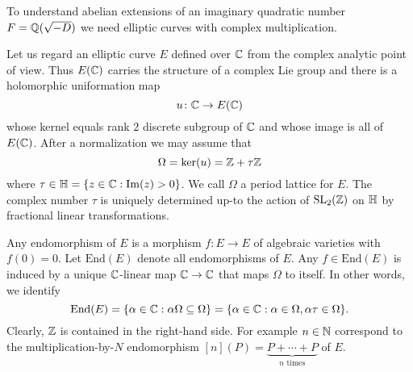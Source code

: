 To understand abelian extensions of an imaginary quadratic number
$F={\mathbb{Q}}(\sqrt{-D})$ we need elliptic curves with complex
multiplication.

Let us regard an elliptic curve $E$ defined over ${\mathbb{C}}$ from the
complex analytic point of view. Thus $E({\mathbb{C}})$ carries the structure of
a complex Lie group and there is a holomorphic uniformation map
\begin{equation*}
  u \colon {\mathbb{C}} \rightarrow E({\mathbb{C}})
\end{equation*}
whose kernel equals rank $2$ discrete subgroup of ${\mathbb{C}}$ and whose
image is all of $E({\mathbb{C}})$. After a normalization we may assume that
\begin{equation*}
  \Omega = \mathrm{ker}(u) = {\mathbb{Z}}+\tau{\mathbb{Z}}
\end{equation*}
where $\tau\in {\mathbb{H}} = \{z\in {\mathbb{C}} : \mathrm{Im}(z)>0\}$. We call
$\Omega$ a period lattice for $E$. The complex number $\tau$ is
uniquely determined up-to the action of $\mathrm{SL}_2({\mathbb{Z}})$ on ${\mathbb{H}}$
by fractional linear transformations. 

Any endomorphism of $E$ is a morphism $f\colon E\rightarrow E$ of
algebraic varieties with $f(0)=0$. Let $\mathrm{End}(E)$ denote all
endomorphisms of $E$. Any $f\in \mathrm{End}(E)$ is
induced by a unique ${\mathbb{C}}$-linear map
${\mathbb{C}}\rightarrow {\mathbb{C}}$ that maps $\Omega$ to itself. In other words, we
identify
\begin{equation*}
  \mathrm{End}(E) = \{ \alpha\in{\mathbb{C}} : \alpha \Omega \subseteq \Omega \}
  = \{\alpha\in {\mathbb{C}} : \alpha\in \Omega, \alpha\tau\in \Omega\}. 
\end{equation*}
Clearly,  ${\mathbb{Z}}$ is contained in the right-hand side. For example  $n\in{\mathbb{N}}$
correspond to the multiplication-by-$N$ endomorphism $[n](P) =
\underbrace{P+\cdots +P}_{n\text{ times}}$ of $E$.

